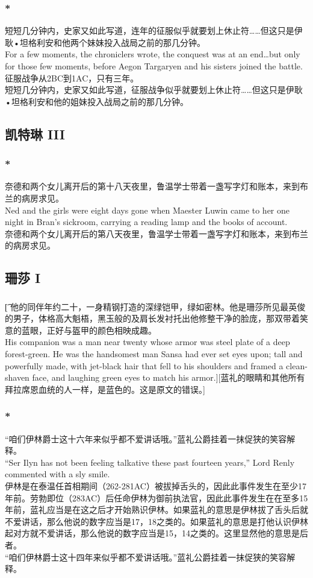 \documentclass[12pt,a4paper]{article}
\newcommand{\h}[1]{{\color{red}#1}\\}
\newcommand{\la}[1]{{\color{blue}#1}\\}
\begin{document}
\subsubsection{\color{red}*}\la{
短短几分钟内，史家又如此写道，连年的征服似乎就要划上休止符……但这只是伊耿•坦格利安和他两个妹妹投入战局之前的那几分钟。\\
For a few moments, the chroniclers wrote, the conquest was at an end\ldots but only for those few moments, before Aegon Targaryen and his sisters joined the battle.}\h{
征服战争从2BC到1AC，只有三年。}
短短几分钟内，史家又如此写道，征服战争似乎就要划上休止符……但这只是伊耿•坦格利安和他的姐妹投入战局之前的那几分钟。

\subsection{凯特琳 III}
\subsubsection{\color{red}*}\la{
奈德和两个女儿离开后的第十八天夜里，鲁温学士带着一盏写字灯和账本，来到布兰的病房求见。\\
Ned and the girls were eight days gone when Maester Luwin came to her one night in Bran's sickroom, carrying a reading lamp and the books of account.}
奈德和两个女儿离开后的第八天夜里，鲁温学士带着一盏写字灯和账本，来到布兰的病房求见。
	
	
\subsection{珊莎 I}
\subsubsection{}\t[
	他的同伴年约二十，一身精钢打造的深绿铠甲，绿如密林。他是珊莎所见最英俊的男子，体格高大魁梧，黑玉般的及肩长发衬托出他修整干净的脸庞，那双带着笑意的蓝眼，正好与盔甲的颜色相映成趣。\\
	His companion was a man near twenty whose armor was steel plate of a deep forest-green. He was the handsomest man Sansa had ever set eyes upon; tall and powerfully made, with jet-black hair that fell to his shoulders and framed a clean-shaven face, and laughing green eyes to match his armor.][蓝礼的眼睛和其他所有拜拉席恩血统的人一样，是蓝色的。这是原文的错误。]

\subsubsection{\color{red}*}\la{
	“咱们伊林爵士这十六年来似乎都不爱讲话哦。”蓝礼公爵挂着一抹促狭的笑容解释。\\
	“Ser Ilyn has not been feeling talkative these past fourteen years,” Lord Renly commented with a sly smile.}\h{
	伊林是在泰温任首相期间（262-281AC）被拔掉舌头的，因此此事件发生在至少17年前。劳勃即位（283AC）后任命伊林为御前执法官，因此此事件发生在在至多15年前，蓝礼应当是在这之后才开始熟识伊林。如果蓝礼的意思是伊林拔了舌头后就不爱讲话，那么他说的数字应当是17，18之类的。如果蓝礼的意思是打他认识伊林起对方就不爱讲话，那么他说的数字应当是15，14之类的。这里显然他的意思是后者。}
	“咱们伊林爵士这十四年来似乎都不爱讲话哦。”蓝礼公爵挂着一抹促狭的笑容解释。
	
\end{document}
